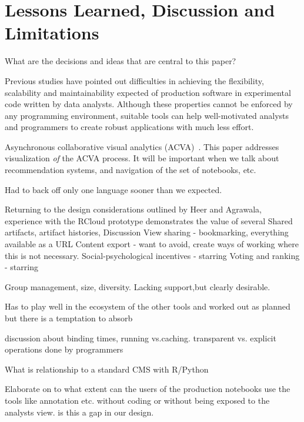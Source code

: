 \section{Lessons Learned, Discussion and Limitations}

What are the decisions and ideas that are central to this paper?

Previous studies have pointed out difficulties in achieving the flexibility,
scalability and maintainability expected of production software in experimental
code written by data analysts.
Although these properties cannot be enforced by any programming environment,
suitable tools can help well-motivated analysts and programmers to create
robust applications with much less effort.

Asynchronous collaborative visual analytics
(ACVA)~\cite{Chen:2011:SEC}. This paper addresses visualization
\emph{of} the ACVA process. It will be important when we talk about
recommendation systems, and navigation of the set of notebooks, etc.

Had to back off only one language sooner than we expected.

Returning to the design considerations outlined by Heer and Agrawala, experience with the RCloud prototype demonstrates the value of several
Shared artifacts, artifact histories, 
Discussion
View sharing - bookmarking, everything available as a URL
Content export - want to avoid, create ways of working where this is not necessary.
Social-psychological incentives - starring
Voting and ranking - starring

Group management, size, diversity.  Lacking support,but clearly desirable.

Has to play well in the ecosystem of the other tools and worked out as planned but there is a temptation to absorb 

discussion about binding times, running vs.caching.
transparent vs. explicit operations done by programmers

What is relationship to a standard CMS with R/Python

Elaborate on to what extent can the users of the production notebooks use the tools like annotation etc. without coding or without being exposed to the analysts view. is this a gap in our design.
